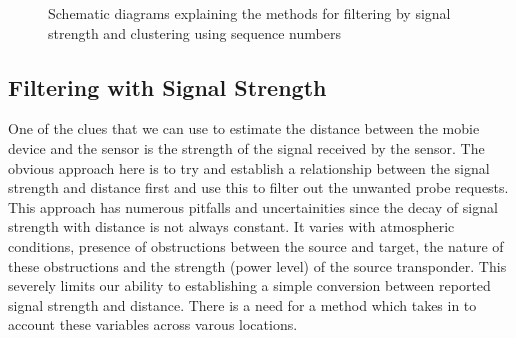 \begin{figure}
	\centering
	\caption{Schematic diagrams explaining the methods for filtering by signal strength and clustering using sequence numbers} \label{sample-figure}
\end{figure}

\subsection{Filtering with Signal Strength}
One of the clues that we can use to estimate the distance between the mobie device and the sensor is the strength of the signal received by the sensor. 
The obvious approach here is to try and establish a relationship between the signal strength and distance first and use this to filter out the unwanted probe requests.
This approach has numerous pitfalls and uncertainities since the decay of signal strength with distance is not always constant.
It varies with atmospheric conditions, presence of obstructions between the source and target, the nature of these obstructions and the strength (power level) of the source transponder.
This severely limits our ability to establishing a simple conversion between reported signal strength and distance.
There is a need for a method which takes in to account these variables across varous locations.

